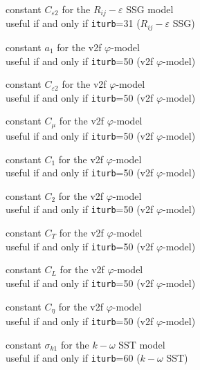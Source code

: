 {constant $C_{\varepsilon 2}$ for the $R_{ij}-\varepsilon$ SSG model\\
useful if and only if {\tt iturb}=31
($R_{ij}-\varepsilon$ SSG)}


{constant $a_1$ for the v2f $\varphi$-model\\
useful if and only if {\tt iturb}=50
(v2f $\varphi$-model)}

{constant $C_{\varepsilon 2}$ for the v2f $\varphi$-model\\
useful if and only if {\tt iturb}=50
(v2f $\varphi$-model)}

{constant $C_\mu$ for the v2f $\varphi$-model\\
useful if and only if {\tt iturb}=50
(v2f $\varphi$-model)}

{constant $C_1$ for the v2f $\varphi$-model\\
useful if and only if {\tt iturb}=50
(v2f $\varphi$-model)}

{constant $C_2$ for the v2f $\varphi$-model\\
useful if and only if {\tt iturb}=50
(v2f $\varphi$-model)}

{constant $C_T$ for the v2f $\varphi$-model\\
useful if and only if {\tt iturb}=50
(v2f $\varphi$-model)}

{constant $C_L$ for the v2f $\varphi$-model\\
useful if and only if {\tt iturb}=50
(v2f $\varphi$-model)}

{constant $C_\eta$ for the v2f $\varphi$-model\\
useful if and only if {\tt iturb}=50
(v2f $\varphi$-model)}


{constant $\sigma_{k1}$ for the $k-\omega$ SST model\\
useful if and only if {\tt iturb}=60
($k-\omega$ SST)}

